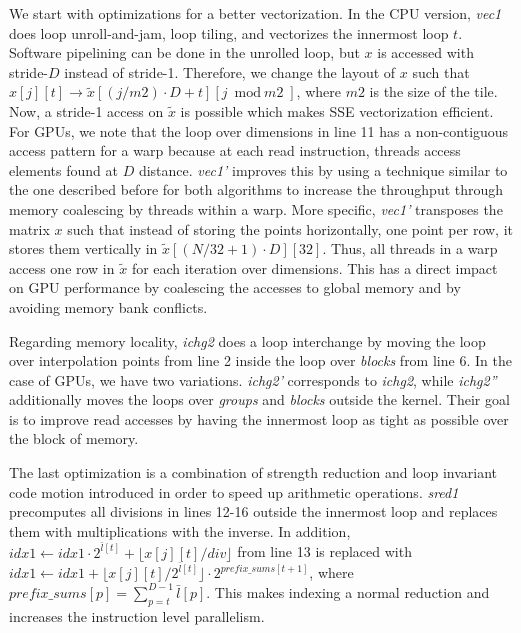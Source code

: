 We start with optimizations for a better vectorization. In the CPU version,
\textit{vec1} does loop unroll-and-jam, loop tiling, and vectorizes the
innermost loop $t$. Software pipelining can be done in the unrolled loop, but
$x$ is accessed with stride-$D$ instead of stride-1. Therefore, we change the
layout of $x$ such that $x[j][t] \rightarrow \tilde{x}[(j/\textit{m2}) \cdot D +
t][j \bmod \textit{m2}]$, where $\textit{m2}$ is the size of the tile. Now, a
stride-1 access on $\tilde{x}$ is possible which makes SSE vectorization
efficient. For GPUs, we note that the loop over dimensions in line 11 has a
non-contiguous access pattern for a warp because at each read instruction,
threads access elements found at $D$ distance. \textit{vec1'} improves this by
using a technique similar to the one described before for both algorithms to
increase the throughput through memory coalescing by threads within a warp.
More specific, \textit{vec1'} transposes the matrix $x$ such that instead of
storing the points horizontally, one point per row, it stores them vertically in
$\tilde{x}[(N/32+1) \cdot D][32]$. Thus, all threads in a warp access one row in
$\tilde{x}$ for each iteration over dimensions. This has a direct impact on
GPU performance by coalescing the accesses to global memory and by avoiding
memory bank conflicts.

Regarding memory locality, \textit{ichg2} does a loop interchange by moving the
loop over interpolation points from line 2 inside the loop over \textit{blocks}
from line 6. In the case of GPUs, we have two variations. \textit{ichg2'}
corresponds to \textit{ichg2}, while \textit{ichg2''} additionally moves the
loops over \textit{groups} and \textit{blocks} outside the kernel. Their goal is
to improve read accesses by having the innermost loop as tight as possible over
the block of memory.

The last optimization is a combination of strength reduction and loop invariant
code motion introduced in order to speed up arithmetic operations.
\textit{sred1} precomputes all divisions in lines 12-16 outside the innermost
loop and replaces them with multiplications with the inverse. In addition, $idx1
\leftarrow idx1 \cdot 2^{\bar{l}[t]} + \lfloor x[j][t] / div \rfloor$ from line
13 is replaced with $idx1 \leftarrow idx1 + \lfloor x[j][t] / 2^{\bar{l}[t]}
\rfloor \cdot 2^{\textit{prefix\_sums}[t + 1]}$, where $\textit{prefix\_sums}[p]
= \sum_{p=t}^{D-1}\bar{l}[p]$. This makes indexing a normal reduction and
increases the instruction level parallelism.